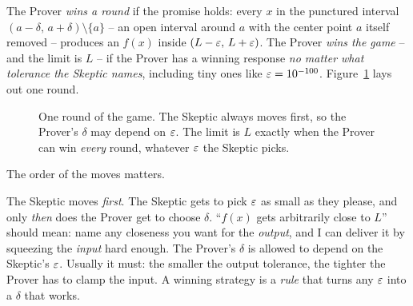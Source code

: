 The Prover \emph{wins a round} if the promise holds: every $x$ in the punctured
interval $(a-\delta,\,a+\delta)\setminus\{a\}$ -- an open interval around $a$
with the center point $a$ itself removed -- produces an $f(x)$
inside $(L-\varepsilon,\,L+\varepsilon)$. The Prover \emph{wins the game} -- and the limit
is $L$ -- if the Prover has a winning response \emph{no matter what
tolerance the Skeptic names}, including tiny ones like $\varepsilon =
10^{-100}$. Figure~\ref{ch06:fig-game-flow} lays out one round.

\begin{figure}[htbp]
\centering
{}
\caption{One round of the game. The Skeptic always moves first, so the Prover's
$\delta$ may depend on $\varepsilon$. The limit is $L$ exactly when the Prover can win
\emph{every} round, whatever $\varepsilon$ the Skeptic picks.}
\label{ch06:fig-game-flow}
\end{figure}

The order of the moves matters.

\begin{intuitionbox}
The Skeptic moves \emph{first}. The Skeptic gets to pick $\varepsilon$ as small as they
please, and only \emph{then} does the Prover get to choose $\delta$.
``$f(x)$ gets arbitrarily close to $L$'' should mean: name any
closeness you want for the \emph{output}, and I can deliver it by squeezing the
\emph{input} hard enough. The Prover's $\delta$ is allowed to depend on the
Skeptic's $\varepsilon$. Usually it must: the smaller the output tolerance, the tighter
the Prover has to clamp the input. A winning strategy is a \emph{rule} that
turns any $\varepsilon$ into a $\delta$ that works.
\end{intuitionbox}


